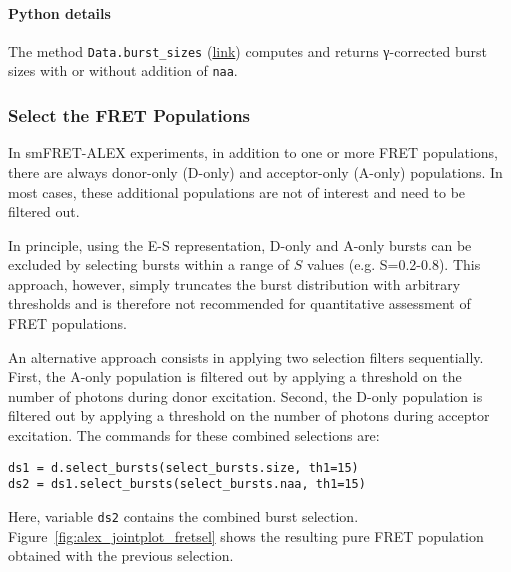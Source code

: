 \paragraph{Python details} The method \verb|Data.burst_sizes|
(\href{http://fretbursts.readthedocs.org/en/latest/data_class.html#fretbursts.burstlib.Data.burst_sizes}{link})
computes and returns γ-corrected burst sizes with or without addition of \verb|naa|.

\subsubsection{Select the FRET Populations}

In smFRET-ALEX experiments, in addition to one or more FRET populations, there are always
donor-only (D-only) and acceptor-only (A-only) populations.
In most cases, these additional populations are not of interest and need to be filtered out.

In principle, using the E-S representation, D-only and A-only bursts
can be excluded by selecting bursts within a range of $S$ values (e.g. S=0.2-0.8). 
This approach, however, simply truncates the burst distribution with arbitrary
thresholds and is therefore not recommended for quantitative assessment of FRET
populations.

An alternative approach consists in applying two selection filters sequentially.
First, the A-only population is filtered out
by applying a threshold on the number of photons during donor excitation.
Second, the D-only population is filtered out by applying a threshold on 
the number of photons during acceptor excitation.
The commands for these combined selections are:

\begin{lstlisting}
ds1 = d.select_bursts(select_bursts.size, th1=15)
ds2 = ds1.select_bursts(select_bursts.naa, th1=15)
\end{lstlisting}

Here, variable \verb|ds2| contains the combined burst selection.
Figure~\ref{fig:alex_jointplot_fretsel} shows the resulting pure FRET
population obtained with the previous selection.
